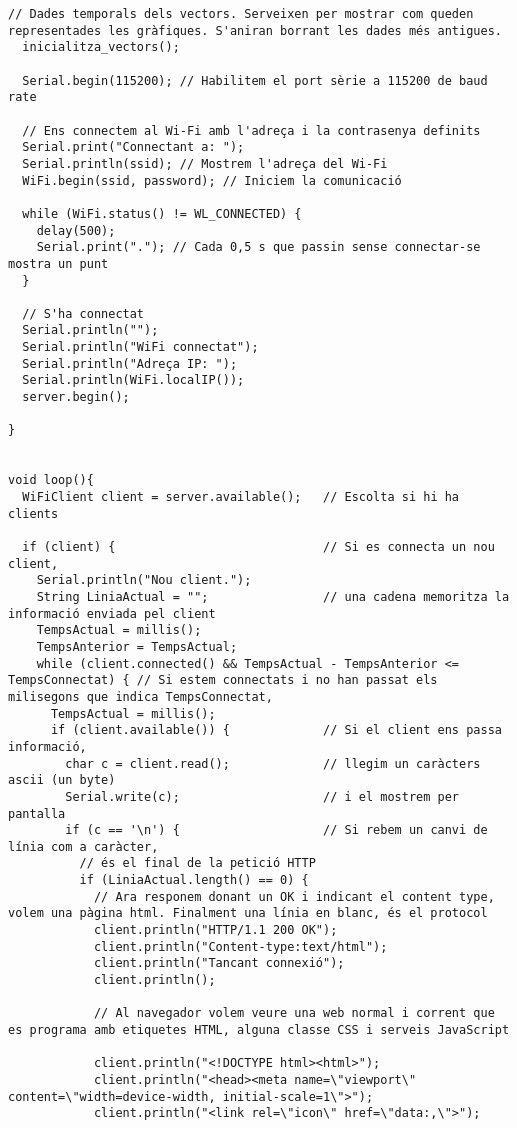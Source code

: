 \begin{lstlisting}[style=myArduino]
  // Dades temporals dels vectors. Serveixen per mostrar com queden representades les gràfiques. S'aniran borrant les dades més antigues.
  inicialitza_vectors();
  
  Serial.begin(115200); // Habilitem el port sèrie a 115200 de baud rate 

  // Ens connectem al Wi-Fi amb l'adreça i la contrasenya definits
  Serial.print("Connectant a: ");
  Serial.println(ssid); // Mostrem l'adreça del Wi-Fi
  WiFi.begin(ssid, password); // Iniciem la comunicació
  
  while (WiFi.status() != WL_CONNECTED) {
    delay(500);
    Serial.print("."); // Cada 0,5 s que passin sense connectar-se mostra un punt
  }
  
  // S'ha connectat
  Serial.println("");
  Serial.println("WiFi connectat");
  Serial.println("Adreça IP: ");
  Serial.println(WiFi.localIP());
  server.begin();
  
}


void loop(){
  WiFiClient client = server.available();   // Escolta si hi ha clients

  if (client) {                             // Si es connecta un nou client,
    Serial.println("Nou client.");          
    String LiniaActual = "";                // una cadena memoritza la informació enviada pel client
    TempsActual = millis();
    TempsAnterior = TempsActual;
    while (client.connected() && TempsActual - TempsAnterior <= TempsConnectat) { // Si estem connectats i no han passat els milisegons que indica TempsConnectat,
      TempsActual = millis();         
      if (client.available()) {             // Si el client ens passa informació,
        char c = client.read();             // llegim un caràcters ascii (un byte)
        Serial.write(c);                    // i el mostrem per pantalla
        if (c == '\n') {                    // Si rebem un canvi de línia com a caràcter,
          // és el final de la petició HTTP
          if (LiniaActual.length() == 0) {
            // Ara responem donant un OK i indicant el content type, volem una pàgina html. Finalment una línia en blanc, és el protocol
            client.println("HTTP/1.1 200 OK");
            client.println("Content-type:text/html");
            client.println("Tancant connexió");
            client.println();
      
            // Al navegador volem veure una web normal i corrent que es programa amb etiquetes HTML, alguna classe CSS i serveis JavaScript
            
            client.println("<!DOCTYPE html><html>");
            client.println("<head><meta name=\"viewport\" content=\"width=device-width, initial-scale=1\">");
            client.println("<link rel=\"icon\" href=\"data:,\">");


\end{lstlisting}

